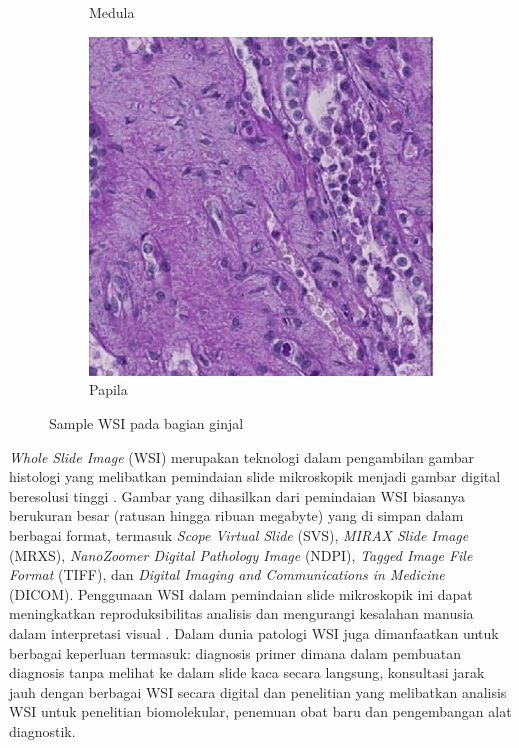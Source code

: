 \begin{figure}[H]
\begin{subfigure}[b]{0.3\textwidth}
		\caption{Medula}
		\label{fig:medula}
	\end{subfigure}
	\hfill
	\begin{subfigure}[b]{0.3\textwidth}
		\centering
		\includegraphics[width=\textwidth]{gambar/papila.png}
		\caption{Papila}
		\label{fig:papila}
	\end{subfigure}
	\caption{Sample WSI pada bagian ginjal \cite{howard_hubmap_2023}}
	\label{fig:ginjal}
\end{figure}

\noindent \textit{Whole Slide Image} (WSI) merupakan teknologi dalam pengambilan gambar histologi yang melibatkan pemindaian slide mikroskopik menjadi gambar digital beresolusi tinggi \cite{hanna_whole_2020}. Gambar yang dihasilkan dari pemindaian WSI biasanya berukuran besar (ratusan hingga ribuan megabyte) yang di simpan dalam berbagai format, termasuk \textit{Scope Virtual Slide} (SVS), \textit{MIRAX Slide Image} (MRXS), \textit{NanoZoomer Digital Pathology Image} (NDPI), \textit{Tagged Image File Format} (TIFF), dan \textit{Digital Imaging and Communications in Medicine }(DICOM). Penggunaan WSI dalam pemindaian slide mikroskopik ini dapat meningkatkan reproduksibilitas analisis dan mengurangi kesalahan manusia dalam interpretasi visual \cite{li_hardware-software_2023}. Dalam dunia patologi WSI juga dimanfaatkan untuk berbagai keperluan termasuk: diagnosis primer dimana dalam pembuatan diagnosis tanpa melihat ke dalam slide kaca secara langsung, konsultasi jarak jauh dengan berbagai WSI secara digital dan penelitian yang melibatkan analisis WSI untuk penelitian biomolekular, penemuan obat baru dan pengembangan alat diagnostik.


